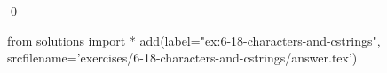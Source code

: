 
\begin{ex}
  \label{ex:6-18-characters-and-cstrings}
  
  \qed
\end{ex}
\begin{python0}
from solutions import *
add(label="ex:6-18-characters-and-cstrings",
    srcfilename='exercises/6-18-characters-and-cstrings/answer.tex')
\end{python0}
